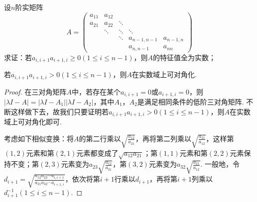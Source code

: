 \documentclass[../../main.tex]{subfiles}%
\begin{document}
\begin{proposition}[三对角矩阵可对角化的条件]\label{proposition:例9.74}
设\(n\)阶实矩阵
\[
A = 
\begin{pmatrix}
a_{11} & a_{12} & & & \\
a_{21} & a_{22} & \ddots & & \\
& \ddots & \ddots & \ddots & \\
& & \ddots & a_{n - 1,n - 1} & a_{n - 1,n} \\
& & & a_{n,n - 1} & a_{n n}
\end{pmatrix}
\]
求证：若\(a_{i,i + 1}a_{i + 1,i}\geqslant 0(1\leqslant  i\leqslant  n - 1)\)，则\(A\)的特征值全为实数；

若\(a_{i,i + 1}a_{i + 1,i}>0(1\leqslant  i\leqslant  n - 1)\)，则\(A\)在实数域上可对角化.
\end{proposition}
\begin{proof}

在三对角矩阵\(A\)中，若存在某个\(a_{i,i + 1}=0\)或\(a_{i + 1,i}=0\)，则\(\vert\lambda I - A\vert=\vert\lambda I - A_1\vert\vert\lambda I - A_2\vert\)，其中\(A_1\)，\(A_2\)是满足相同条件的低阶三对角矩阵. 不断这样做下去，故我们只要证明若\(a_{i,i + 1}a_{i + 1,i}>0(1\leqslant  i\leqslant  n - 1)\)，则\(A\)在实数域上可对角化即可. 

考虑如下相似变换：将\(A\)的第二行乘以\(\sqrt{\frac{a_{12}}{a_{21}}}\)，再将第二列乘以\(\sqrt{\frac{a_{21}}{a_{12}}}\)，这样第\((1,2)\)元素和第\((2,1)\)元素都变成了\(\sqrt{a_{12}a_{21}}\)；第\((1,1)\)元素和第\((2,2)\)元素保持不变；第\((2,3)\)元素变为\(a_{23}\sqrt{\frac{a_{12}}{a_{21}}}\)，第\((3,2)\)元素变为\(a_{32}\sqrt{\frac{a_{21}}{a_{12}}}\). 一般地，令\(d_{i + 1}=\sqrt{\frac{a_{12}a_{23}\cdots a_{i,i + 1}}{a_{21}a_{32}\cdots a_{i + 1,i}}}\)，依次将第\(i + 1\)行乘以\(d_{i + 1}\)，再将第\(i + 1\)列乘以\(d_{i + 1}^{-1}(1\leqslant  i\leqslant  n - 1)\).


\end{proof}
\end{document}
